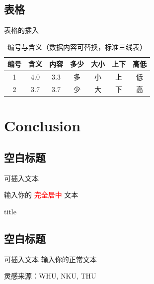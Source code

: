 \documentclass{beamer}
\begin{document}
\subsection{表格}
    \begin{frame}{表格的插入}
        \begin{table}[htpb]
            \centering
            \caption{编号与含义（数据内容可替换，标准三线表）}
            \label{tab:number}
            \begin{tabular}{ccccccc}\toprule
                编号 & 含义 & 内容 & 多少 & 大小 & 上下 & 高低 \\\midrule
                1 & 4.0 & 3.3 & 多 & 小 & 上 & 低 \\
                2 & 3.7 & 3.7 & 少 & 大 & 下 & 高 \\\bottomrule
            \end{tabular}
        \end{table}
    \end{frame}

\section{Conclusion}
\subsection{空白标题}
\begin{frame}{可插入文本}
    
    \centering 输入你的 \textcolor{red}{完全居中} 文本
    
    
    \begin{beamercolorbox}[sep=4pt, left, shadow=true, rounded=true, wd=\textwidth]{title}
    \end{beamercolorbox}
\end{frame}

\subsection{空白标题}
    \begin{frame}{可插入文本}
    输入你的正常文本

    灵感来源：WHU\cite{WHU}, NKU\cite{NKU}, THU\cite{THU}
    \end{frame}
\end{document}

